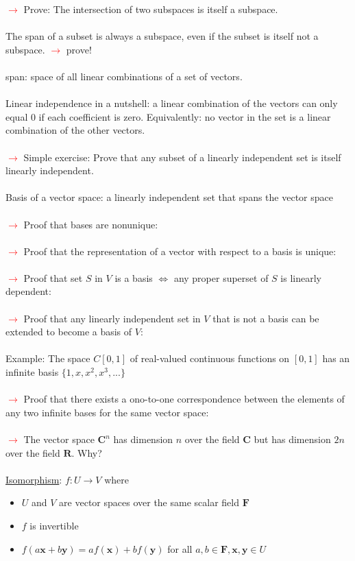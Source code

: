 \documentclass[a4paper]{article}
\newcommand{\x}{\textbf{x}}
\newcommand{\y}{\textbf{y}}
\newcommand{\F}{\textbf{F}}
\newcommand{\R}{\textbf{R}}
\newcommand{\C}{\textbf{C}}
\newcommand{\att}{\textcolor{red}{$\rightarrow$ }}
\begin{document}
\att Prove: The intersection of two subspaces is itself a subspace.\\~\\
The span of a subset is always a subspace, even if the subset is itself not a subspace. \att prove! \\~\\
span: space of all linear combinations of a set of vectors.\\~\\
Linear independence in a nutshell: a linear combination of the vectors can only equal 0 if each coefficient is zero. Equivalently: no vector in the set is a linear combination of the other vectors.\\~\\
\att Simple exercise: Prove that any subset of a linearly independent set is itself linearly independent.\\~\\
Basis of a vector space: a linearly independent set that spans the vector space\\~\\
\att Proof that bases are nonunique: \\~\\
\att Proof that the representation of a vector with respect to a basis is unique: \\~\\
\att Proof that set $S$ in $V$ is a basis $\iff$ any proper superset of $S$ is linearly dependent: \\~\\
\att Proof that any linearly independent set in $V$ that is not a basis can be extended to become a basis of $V$: \\~\\
Example: The space $C[0,1]$ of real-valued continuous functions on $[0,1]$ has an infinite basis $\{1,x,x^2,x^3,...\}$ \\~\\
\att Proof that there exists a ono-to-one correspondence between the elements of any two infinite bases for the same vector space: \\~\\
\att The vector space $\C^n$ has dimension $n$ over the field $\C$ but has dimension $2n$ over the field $\R$. Why?\\~\\
\underline{Isomorphism}: $f:U \rightarrow V$ where
\begin{itemize}
 \item $U$ and $V$ are vector spaces over the same scalar field $\F$
 \item $f$ is invertible
 \item $f(a\x+b\y) = af(\x)+bf(\y)$ for all $a,b \in \F, \x,\y \in U$
\end{itemize}
\end{document}

